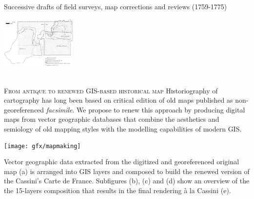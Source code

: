 \documentclass[portrait,a0]{sciposter}
\begin{document}
\begin{minipage}[b]{\textwidth}
\begin{multicols}{3}
    \begin{center}
      \captionsetup{type=figure}
      \caption{\scriptsize{Successive drafts of field surveys, map corrections and reviews (1759-1775)}}
      \label{map:contours}
      \includegraphics[width=0.28\textwidth]{gfx/Contours}
    \end{center}
~\\
    \normalsize
    \textsc{From antique to renewed GIS-based historical map}
    \vfill
    \small \lettrine{H}istoriography of cartography has long been based on critical edition of old maps published as non-georeferenced \textit{facsimile}. We propose to renew this approach by producing digital maps from vector geographic databases that combine the aesthetics and semiology of old mapping styles with the modelling capabilities of modern GIS.
    \begin{center}
     
      \texttt{[image: gfx/mapmaking]}
       \captionsetup{type=figure}
      \caption{\scriptsize{Vector geographic data extracted from the digitized and georeferenced original map (a) is arranged into GIS layers and composed to build the renewed version of the Cassini's Carte de France. Subfigures (b), (c) and (d) show an overview of the the 15-layers composition that results in the final rendering à la Cassini (e).}}
    \end{center}    
    
  \end{multicols}
\end{minipage}
\end{document}
